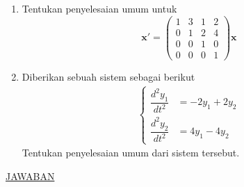 \documentclass[a4paper]{article}
\theoremstyle{definisi}
\numberwithin{equation}{section}
\begin{document}
\begin{enumerate}
    \item Tentukan penyelesaian umum untuk
    \begin{equation*}
      \mathbf{x'}=\begin{pmatrix}
        1&3&1&2\\
        0&1&2&4\\
        0&0&1&0\\
        0&0&0&1
      \end{pmatrix}\mathbf{x}
    \end{equation*}
    \item Diberikan sebuah sistem sebagai berikut
    \begin{align*}
      \begin{cases}
        \dfrac{d^2y_1}{dt^2}&=-2y_1+2y_2\\
        \dfrac{d^2y_2}{dt^2}&=4y_1-4y_2
      \end{cases}
    \end{align*}
    Tentukan penyelesaian umum dari sistem tersebut.
  \end{enumerate}
  \newpage
  \underline{JAWABAN}
\end{document}
